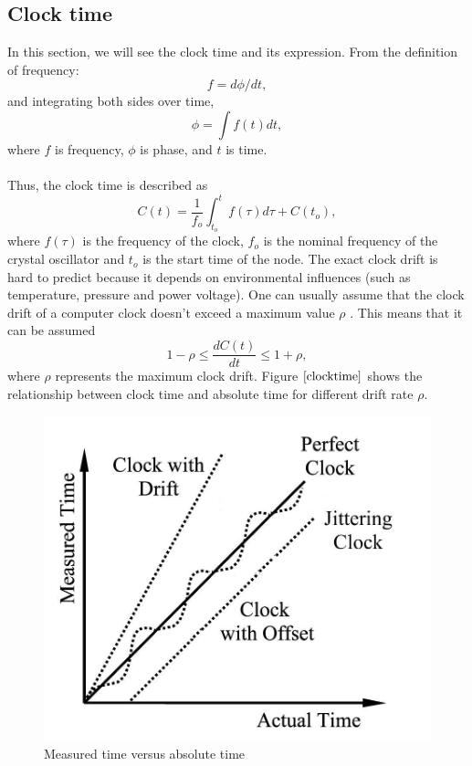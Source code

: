 \documentclass[a4paper,10pt]{report}
\begin{document}
\subsection{\textbf{Clock time}}
In this section, we will see the clock time and its expression. From the definition of frequency:
\begin{equation}
f = d\phi/dt \label{freq_defn} ,
\end{equation}
and integrating both sides over time,
 \begin{equation}
\phi =\int f(t)dt ,
 \end{equation}
where $f$ is frequency, $\phi$ is phase, and $t$ is time.\paragraph*{}
Thus, the clock time is described as
\begin{equation}
C(t) = \frac{1}{f_o}\int_{t_o}^{t} {f(\tau)d\tau} + C(t_o) ,
\label{clock}
\end{equation}
where $f(\tau)$ is the frequency of the clock, $f_o$ is the nominal frequency of the crystal oscillator and $t_o$ is the start time of
the node. The exact clock drift is hard to predict because it depends on environmental influences (such as temperature, pressure
and power voltage). One can usually assume that the clock drift of a computer clock doesn't exceed a maximum value $\rho$ . This means
that it can be assumed
\begin{equation}
1-\rho \leq \frac{dC(t)}{dt} \leq 1+\rho ,
\end{equation}
where $\rho$ represents the maximum clock drift. Figure $\ref{clocktime}$ shows the relationship between clock time and absolute time for different drift rate $\rho$.
\begin{figure}
\centering
\includegraphics[width=0.5 \textwidth]{actualvsmeasuredtime}
\caption{Measured time versus absolute time} \label{clocktime}
\end{figure}
\end{document}
